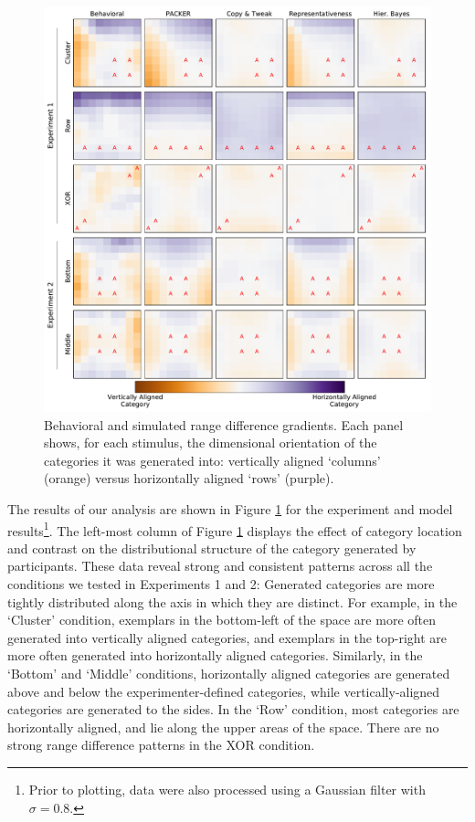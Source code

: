 \documentclass[12pt]{article}
\begin{document}
\begin{flushleft}
\begin{figure}[p]
    \begin{center} 
      \includegraphics[width=\textwidth]{figs/range-diff-gradients.pdf}
      \caption{Behavioral and simulated range difference gradients. Each panel
        shows, for each stimulus, the dimensional orientation of the categories
        it was generated into: vertically aligned `columns' (orange) versus
        horizontally aligned `rows' (purple).}
      \label{fig:range-diff-gradients}
    \end{center}
\end{figure}

The results of our analysis are shown in Figure \ref{fig:range-diff-gradients}
for the experiment and model results\footnote{Prior to plotting, data were also
processed using a Gaussian filter with $\sigma = 0.8$.}. The left-most column of
Figure \ref{fig:range-diff-gradients} displays the effect of category location
and contrast on the distributional structure of the category generated by
participants. These data reveal strong and consistent patterns across all the
conditions we tested in Experiments 1 and 2: Generated categories are more
tightly distributed along the axis in which they are distinct. For example, in
the `Cluster' condition, exemplars in the bottom-left of the space are more
often generated into vertically aligned categories, and exemplars in the
top-right are more often generated into horizontally aligned categories.
Similarly, in the `Bottom' and `Middle' conditions, horizontally aligned
categories are generated above and below the experimenter-defined categories,
while vertically-aligned categories are generated to the sides. In the `Row'
condition, most categories are horizontally aligned, and lie along the upper
areas of the space. There are no strong range difference patterns in the XOR
condition.


\end{flushleft}
\end{document}
